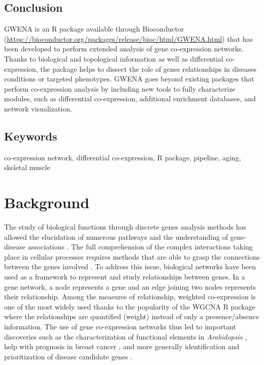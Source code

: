 \subsection{Conclusion}
GWENA is an R package available through Bioconductor (\url{https://bioconductor.org/packages/release/bioc/html/GWENA.html}) that has been developed to perform extended analysis of gene co-expression networks. Thanks to biological and topological information as well as differential co-expression, the package helps to dissect the role of genes relationships in diseases conditions or targeted phenotypes. GWENA goes beyond existing packages that perform co-expression analysis by including new tools to fully characterize modules, such as differential co-expression, additional enrichment databases, and network visualization.

\subsection{Keywords}
co-expression network, differential co-expression, R package, pipeline, aging, skeletal muscle





\section{Background}


The study of biological functions through discrete genes analysis methods has allowed the elucidation of numerous pathways and the understanding of gene-disease associations . The full comprehension of the complex interactions taking place in cellular processes requires methods that are able to grasp the connections between the genes involved . To address this issue, biological networks have been used as a framework to represent and study relationships between genes. In a gene network, a node represents a gene and an edge joining two nodes represents their relationship. Among the measures of relationship, weighted co-expression is one of the most widely used thanks to the popularity of the WGCNA R package  where the relationships are quantified (weight) instead of only a presence/absence information. The use of gene co-expression networks thus led to important discoveries such as the characterization of functional elements in \textit{Arabidopsis} , help with prognosis in breast cancer , and more generally identification and prioritization of disease candidate genes . 

